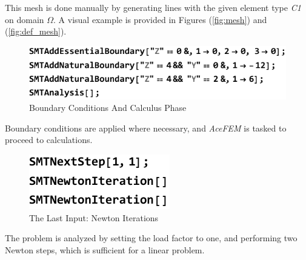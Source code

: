 This mesh is done manually by generating lines with the given element type \textit{C1} on domain \textit{$\Omega$}. A visual example is provided in Figures (\ref{fig:mesh}) and (\ref{fig:def_mesh}).
\clearpage

\begin{figure}[htb]
	\includegraphics{figures/acefem_input_2}
	\caption{Boundary Conditions And Calculus Phase}
	\label{fig:bound}
\end{figure}

Boundary conditions are applied where necessary, and \textit{AceFEM} is tasked to proceed to calculations.

\begin{figure}[htb]
	\includegraphics{figures/acefem_input_3}
	\caption{The Last Input: Newton Iterations }
	\label{fig:newton}
\end{figure}

The problem is analyzed by setting the load factor to one, and performing two Newton steps, which is sufficient for a linear problem.

